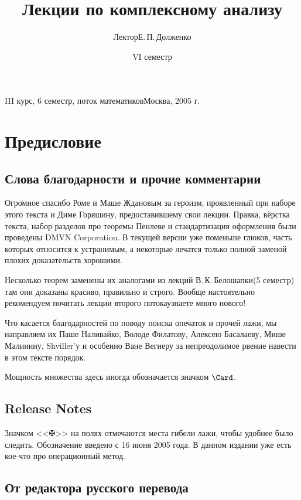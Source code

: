 \documentclass[a4paper]{article}
\title{Лекции по комплексному анализу}
\author{Лектор\т Е.\,П.\,Долженко}
\date{VI семестр}
\begin{document}
{III курс, 6 семестр, поток математиков}{Москва, 2005 г.}

\pagebreak

\tableofcontents

\pagebreak

\section*{Предисловие}

\subsection*{Слова благодарности и прочие комментарии}

Огромное спасибо Роме и Маше Ждановым за героизм, проявленный при наборе этого текста и Диме Горяшину,
предоставившему свои лекции.
Правка, вёрстка текста, набор разделов про теоремы Пенлеве и стандартизация оформления были проведены
DMVN Corporation. В текущей версии уже поменьше глюков, часть которых относится к устранимым,
а некоторые лечатся только полной заменой плохих доказательств хорошими.

\medskip

Несколько теорем заменены их аналогами из лекций В.\,К.\,Белошапки\т (5 семестр) там они
доказаны красиво, правильно и строго. Вообще настоятельно рекомендуем почитать лекции второго
потока\т узнаете много нового!

Что касается благодарностей по поводу поиска опечаток и прочей лажи, мы направляем их
Паше Наливайко, Володе Филатову, Алексею Басалаеву, Мише Малинину, Shviller'у и особенно Ване Вегнеру за непреодолимое рвение
навести в этом тексте порядок.

Мощность множества здесь иногда обозначается значком $\Card$.

\subsection*{Release Notes}

Значком <<$\maltese$>> на полях отмечаются места гибели лажи, чтобы удобнее было следить.
Обозначение введено с 16 июня 2005 года. В данном издании уже есть кое-что про операционный метод.

\subsection*{От редактора русского перевода}
\end{document}
